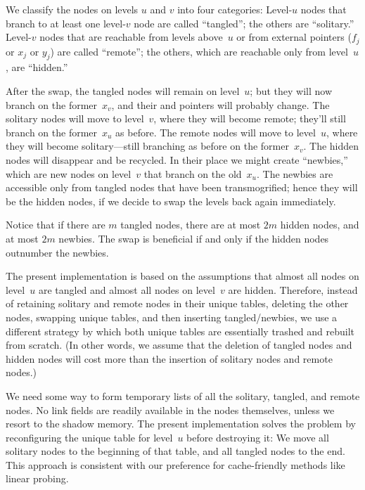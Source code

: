 We classify the nodes on levels $u$ and $v$ into four
categories:
Level-$u$ nodes that branch to at least one level-$v$ node are called
``tangled''; the others are ``solitary.'' Level-$v$ nodes that are
reachable from levels above~$u$ or from external pointers ($f_j$ or
$x_j$ or $y_j$) are called ``remote''; the others, which are reachable
only from level~$u$, are ``hidden.''

After the swap, the tangled nodes will remain on level~$u$; but they
will now branch on the former~$x_v$, and their  and 
pointers
will probably change. The solitary nodes will move to
level~$v$, where they will become remote; they'll still branch
on the former~$x_u$ as before.
The remote nodes will move to level~$u$, where they will become
solitary---still branching as before on the former~$x_v$.
The hidden nodes will
disappear and be recycled. In their place we might create ``newbies,''
which are new nodes on level~$v$ that branch on the old~$x_u$.
The newbies are accessible only from tangled nodes that have been
transmogrified; hence they will be
the hidden nodes, if we decide to swap the levels back again immediately.

Notice that if there are $m$ tangled nodes, there are at most $2m$
hidden nodes, and at most $2m$ newbies. The swap is beneficial if and
only if the hidden nodes outnumber the newbies.

The present implementation
is based on the assumptions that almost all nodes on level~$u$
are tangled and almost all nodes on level~$v$ are hidden.
Therefore, instead of retaining solitary and remote nodes in their unique
tables, deleting the other nodes, swapping unique tables, and then inserting
tangled/newbies, we use a different strategy by which both unique tables
are essentially trashed and rebuilt from scratch. (In other words,
we assume that the deletion of
tangled nodes and hidden nodes will cost more than the insertion of
solitary nodes and remote nodes.)

We need some way to form temporary lists of all the solitary, tangled, and
remote nodes. No link fields are readily available in the nodes themselves,
unless we resort to the shadow memory.
The present implementation solves the problem by reconfiguring
the unique table for level~$u$ before destroying it: We move
all solitary nodes to the beginning of that table, and all tangled
nodes to the end. This approach is consistent with our preference for
cache-friendly methods like linear probing.

